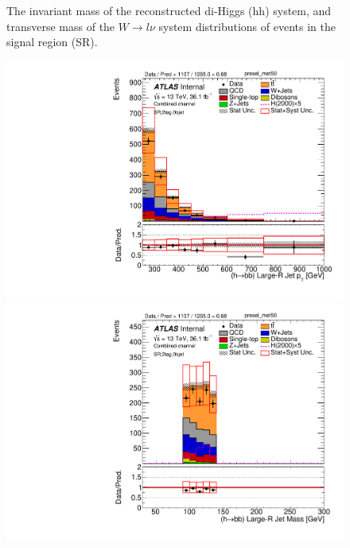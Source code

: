 \begin{figure}[!h]
\begin{center}
\caption{The invariant mass of the reconstructed di-Higgs (hh) system, \met and transverse mass of the $W \to l\nu$ system 
distributions of events in the signal region (SR).}
\label{fig:boosted_SR_mainplots}
\end{center}
\end{figure}

\begin{figure}[!h]
\begin{center}
\includegraphics[scale=0.33]{./figures/boosted/PlotsInMbbSR/Unblinded/DataMC_2tag_0bjet_SR_lepton_presel_met50_HbbPt}
\includegraphics[scale=0.33]{./figures/boosted/PlotsInMbbSR/Unblinded/DataMC_2tag_0bjet_SR_lepton_presel_met50_HbbMass}\\
\par\medskip

\end{center}
\end{figure}

